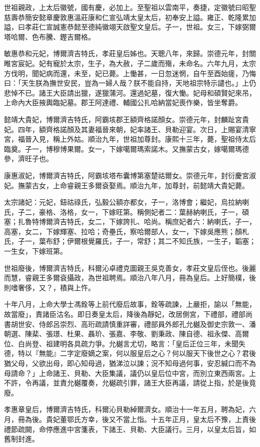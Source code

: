 \begin{pinyinscope}
世祖親政，上太后徽號，國有慶，必加上。至聖祖以雲南平，奏捷，定徽號曰昭聖慈壽恭簡安懿章慶敦惠溫莊康和仁宣弘靖太皇太后，初奉安上謚。雍正、乾隆累加謚，曰孝莊仁宣誠憲恭懿至德純徽翊天啟聖文皇后。子一，世祖。女三，下嫁弼爾塔哈爾、色布騰、鏗吉爾格。

敏惠恭和元妃，博爾濟吉特氏，孝莊皇后姊也。天聰八年，來歸。崇德元年，封關睢宮宸妃。妃有寵於太宗，生子，為大赦，子二歲而殤，未命名。六年九月，太宗方伐明，聞妃病而還，未至，妃已薨。上慟甚，一日忽迷惘，自午至酉始瘥，乃悔曰：「天生朕為撫世安民，豈為一婦人哉？朕不能自持，天地祖宗特示譴也。」上仍悲悼不已。諸王大臣請出獵，遂獵蒲河。還過妃墓，復大慟。妃母和碩賢妃來吊，上命內大臣掖輿臨妃墓。郡王阿達禮、輔國公扎哈納當妃喪作樂，皆坐奪爵。

懿靖大貴妃，博爾濟吉特氏，阿霸垓郡王額齊格諾顏女。崇德元年，封麟趾宮貴妃。四年，額齊格諾顏及其妻福晉來朝，妃率諸王、貝勒迎宴。次日，上賜宴清寧宮，福晉入見，稱上外姑。順治九年，世祖加尊封。康熙十三年，薨，聖祖侍太后臨奠。子一，博穆博果爾。女一，下嫁噶爾瑪索諾木。又撫蒙古女，嫁噶爾瑪德參，濟旺子也。

康惠淑妃，博爾濟吉特氏，阿霸垓塔布囊博第塞楚祜爾女。崇德元年，封衍慶宮淑妃。撫蒙古女，上命睿親王多爾袞娶焉。順治九年，加尊封，前懿靖大貴妃薨。

太宗諸妃：元妃，鈕祜祿氏，弘毅公額亦都女，子一，洛博會；繼妃，烏拉納喇氏，子二，豪格、洛格，女一，下嫁旺第。稱側妃者二：葉赫納喇氏，子一，碩塞；扎魯特博爾濟吉特氏，女二，下嫁誇扎、哈尚。稱庶妃者六：納喇氏，子一，高塞，女二，下嫁輝塞、拉哈；奇壘氏，察哈爾部人，女一，下嫁吳應熊；顏札氏，子一，葉布舒；伊爾根覺羅氏，子一，常舒；其二不知氏族，一生子，韜塞；一生女，下嫁班第。

世祖廢後，博爾濟吉特氏，科爾沁卓禮克圖親王吳克善女，孝莊文皇后侄也。後麗而慧，睿親王多爾袞攝政，為世祖聘焉。順治八年八月，冊為皇后。上好簡樸，後則嗜奢侈，又？，積與上忤。

十年八月，上命大學士馮銓等上前代廢后故事，銓等疏諫，上嚴拒，諭以「無能，故當廢」，責諸臣沽名。即日奏皇太后，降後為靜妃，改居側宮，下禮部，禮部尚書胡世安、侍郎呂崇烈、高珩疏請慎重詳審，禮部員外郎孔允樾及御史宗敦一、潘朝選、陳棐、張璟、杜果、聶玠、張嘉、李敬、劉秉政、陳自德、祖永傑、高爾位、白尚登、祖建明各具疏力爭。允樾言尤切，略言：「皇后正位三年，未聞失德，特以『無能』二字定廢嫡之案，何以服皇后之心？何以服天下後世之心？君後猶父母，父欲出母，即心知母過，猶涕泣以諫；況不知母過何事，安忍緘口而不為母請命？」上命諸王、貝勒、大臣集議，議仍以皇后位中宮，而別立東西兩宮。上不許，令再議，並責允樾覆奏，允樾疏引罪，諸王大臣再議，請從上指，於是後竟廢。

孝惠章皇后，博爾濟吉特氏，科爾沁貝勒綽爾濟女。順治十一年五月，聘為妃，六月，冊為後。貴妃董鄂氏方幸，後又不當上恉。十五年正月，皇太后不豫，上責後禮節疏闕，命停應進中宮箋表，下諸王、貝勒、大臣議行。三月，以皇太后旨，如舊制封進。


\end{pinyinscope}
